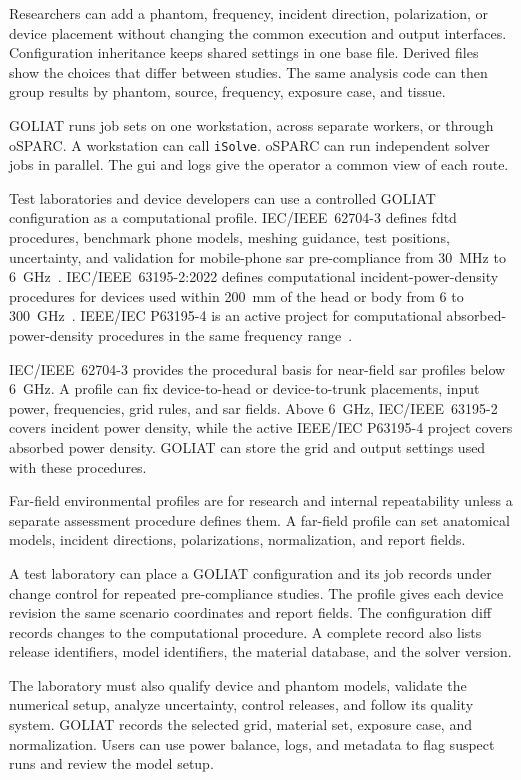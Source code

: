 \documentclass[final,5p,times,twocolumn]{elsarticle}
\begin{document}
Researchers can add a phantom, frequency, incident direction, polarization, or device placement without changing the common execution and output interfaces. Configuration inheritance keeps shared settings in one base file. Derived files show the choices that differ between studies. The same analysis code can then group results by phantom, source, frequency, exposure case, and tissue.

GOLIAT runs job sets on one workstation, across separate workers, or through oSPARC. A workstation can call \texttt{iSolve}. oSPARC can run independent solver jobs in parallel. The \gls{gui} and logs give the operator a common view of each route.

Test laboratories and device developers can use a controlled GOLIAT configuration as a computational profile. IEC/IEEE~62704-3 defines \gls{fdtd} procedures, benchmark phone models, meshing guidance, test positions, uncertainty, and validation for mobile-phone \gls{sar} pre-compliance from 30~MHz to 6~GHz~\cite{IEC627043}. IEC/IEEE~63195-2:2022 defines computational incident-power-density procedures for devices used within 200~mm of the head or body from 6 to 300~GHz~\cite{IEC631952}. IEEE/IEC P63195-4 is an active project for computational absorbed-power-density procedures in the same frequency range~\cite{IEEEP631954}.

IEC/IEEE~62704-3 provides the procedural basis for near-field \gls{sar} profiles below 6~GHz. A profile can fix device-to-head or device-to-trunk placements, input power, frequencies, grid rules, and \gls{sar} fields. Above 6~GHz, IEC/IEEE~63195-2 covers incident power density, while the active IEEE/IEC P63195-4 project covers absorbed power density. GOLIAT can store the grid and output settings used with these procedures.

Far-field environmental profiles are for research and internal repeatability unless a separate assessment procedure defines them. A far-field profile can set anatomical models, incident directions, polarizations, normalization, and report fields.

A test laboratory can place a GOLIAT configuration and its job records under change control for repeated pre-compliance studies. The profile gives each device revision the same scenario coordinates and report fields. The configuration diff records changes to the computational procedure. A complete record also lists release identifiers, model identifiers, the material database, and the solver version.

The laboratory must also qualify device and phantom models, validate the numerical setup, analyze uncertainty, control releases, and follow its quality system. GOLIAT records the selected grid, material set, exposure case, and normalization. Users can use power balance, logs, and metadata to flag suspect runs and review the model setup.
\end{document}
